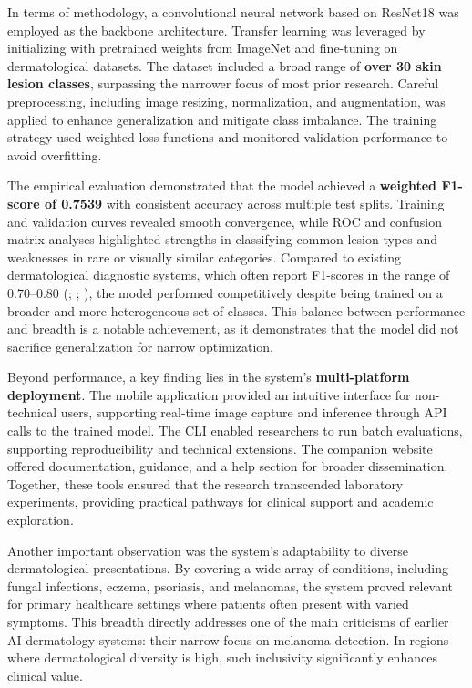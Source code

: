 \documentclass[
  12pt,
  oneside]{article}
\begin{document}
In terms of methodology, a convolutional neural network based on
ResNet18 was employed as the backbone architecture. Transfer learning
was leveraged by initializing with pretrained weights from ImageNet and
fine-tuning on dermatological datasets. The dataset included a broad
range of \textbf{over 30 skin lesion classes}, surpassing the narrower
focus of most prior research. Careful preprocessing, including image
resizing, normalization, and augmentation, was applied to enhance
generalization and mitigate class imbalance. The training strategy used
weighted loss functions and monitored validation performance to avoid
overfitting.

The empirical evaluation demonstrated that the model achieved a
\textbf{weighted F1-score of 0.7539} with consistent accuracy across
multiple test splits. Training and validation curves revealed smooth
convergence, while ROC and confusion matrix analyses highlighted
strengths in classifying common lesion types and weaknesses in rare or
visually similar categories. Compared to existing dermatological
diagnostic systems, which often report F1-scores in the range of
0.70--0.80 (;
;
), the model
performed competitively despite being trained on a broader and more
heterogeneous set of classes. This balance between performance and
breadth is a notable achievement, as it demonstrates that the model did
not sacrifice generalization for narrow optimization.

Beyond performance, a key finding lies in the system's
\textbf{multi-platform deployment}. The mobile application provided an
intuitive interface for non-technical users, supporting real-time image
capture and inference through API calls to the trained model. The CLI
enabled researchers to run batch evaluations, supporting reproducibility
and technical extensions. The companion website offered documentation,
guidance, and a help section for broader dissemination. Together, these
tools ensured that the research transcended laboratory experiments,
providing practical pathways for clinical support and academic
exploration.

Another important observation was the system's adaptability to diverse
dermatological presentations. By covering a wide array of conditions,
including fungal infections, eczema, psoriasis, and melanomas, the
system proved relevant for primary healthcare settings where patients
often present with varied symptoms. This breadth directly addresses one
of the main criticisms of earlier AI dermatology systems: their narrow
focus on melanoma detection. In regions where dermatological diversity
is high, such inclusivity significantly enhances clinical value.
\end{document}
